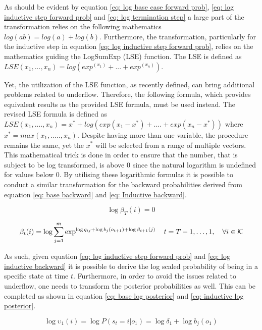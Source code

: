 As should be evident by equation \ref{eq: log base case forward prob}, \ref{eq: log inductive step forward prob} and \ref{eq: log termination step} a large part of the transformation relies on the following mathematics $log(ab) = log(a) + log(b)$. Furthermore, the transformation, particularly for the inductive step in equation \ref{eq: log inductive step forward prob}, relies on the mathematics guiding the LogSumExp (LSE) function. The LSE is defined as $LSE(x_1,...,x_n) = log(exp^{(x_1)}+...+exp^{(x_n)})$.

Yet, the utilization of the LSE function, as recently defined, can bring additional problems related to underflow. Therefore, the following formula, which provides equivalent results as the provided LSE formula, must be used instead. The revised LSE formula is defined as $LSE(x_1,....,x_n) = x^* + log(exp(x_1-x^*)+....+exp(x_n-x^*))$ where $x^* = max(x_1,.....,x_n)$. Despite having more than one variable, the procedure remains the same, yet the $x^*$ will be selected from a range of multiple vectors. This mathematical trick is done in order to ensure that the number, that is subject to be log transformed, is above 0 since the natural logarithm is undefined for values below 0. By utilising these logarithmic formulas it is possible to conduct a similar transformation for the backward probabilities derived from equation \ref{eq: base backward} and \ref{eq: Inductive backward}. 

\begin{equation}
     \log\beta_T(i) = 0
    \label{eq: log base backward}
\end{equation}

\begin{equation}
    \beta_t(i) = \log\sum_{j=1}^m \exp^{\log q_{ij}+\log b_j(o_{t+1})+\log \beta_{t+1}(j)}
    \quad t=T-1,\ldots,1, 
    \quad \forall i \in\operatorname{\mathcal{K}}
    \label{eq: log inductive backward}
\end{equation}

As such, given equation \ref{eq: log inductive step forward prob} and \ref{eq: log inductive backward} it is possible to derive the log scaled probability of being in a specific state at time $t$. Furthermore, in order to avoid the issues related to underflow, one needs to transform the posterior probabilities as well. This can be completed as shown in equation \ref{eq: base log posterior} and \ref{eq: inductive log posterior}.

\begin{equation}
    \log \upsilon_1(i) = \log P(s_t=i | o_1) = \log \delta_1 + \log b_j(o_{1}) 
    \label{eq: base log posterior}
\end{equation}

